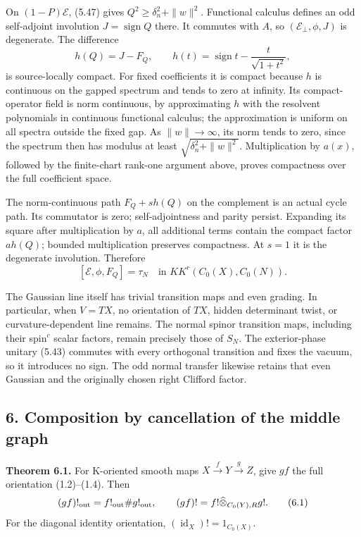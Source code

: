 \documentclass[
  11pt,
]{article}
\begin{document}
On \((1-P)\mathcal E\), (5.47) gives \(Q^2\geq\delta_n^2+\|w\|^2\).
Functional calculus defines an odd self-adjoint involution
\(J=\operatorname{sign}Q\) there. It commutes with \(A\), so
\((\mathcal E_{\perp},\phi,J)\) is degenerate. The difference \[
h(Q)=J-F_Q,
\qquad h(t)=\operatorname{sign}t-\frac{t}{\sqrt{1+t^2}},
\tag{5.52}
\] is source-locally compact. For fixed coefficients it is compact
because \(h\) is continuous on the gapped spectrum and tends to zero at
infinity. Its compact-operator field is norm continuous, by
approximating \(h\) with the resolvent polynomials in continuous
functional calculus; the approximation is uniform on all spectra outside
the fixed gap. As \(\|w\|\to\infty\), its norm tends to zero, since the
spectrum then has modulus at least \(\sqrt{\delta_n^2+\|w\|^2}\).
Multiplication by \(a(x)\), followed by the finite-chart rank-one
argument above, proves compactness over the full coefficient space.

The norm-continuous path \(F_Q+s h(Q)\) on the complement is an actual
cycle path. Its commutator is zero; self-adjointness and parity persist.
Expanding its square after multiplication by \(a\), all additional terms
contain the compact factor \(a h(Q)\); bounded multiplication preserves
compactness. At \(s=1\) it is the degenerate involution. Therefore \[
[\mathcal E,\phi,F_Q]=\tau_N\quad\text{in }KK^r(C_0(X),C_0(N)).
\tag{5.53}
\]

The Gaussian line itself has trivial transition maps and even grading.
In particular, when \(V=TX\), no orientation of \(TX\), hidden
determinant twist, or curvature-dependent line remains. The normal
spinor transition maps, including their spin\(^{c}\) scalar factors,
remain precisely those of \(S_N\). The exterior-phase unitary (5.43)
commutes with every orthogonal transition and fixes the vacuum, so it
introduces no sign. The odd normal transfer likewise retains that even
Gaussian and the originally chosen right Clifford factor.

\subsection{6. Composition by cancellation of the middle
graph}\label{composition-by-cancellation-of-the-middle-graph}

\textbf{Theorem 6.1.} For K-oriented smooth maps
\(X\xrightarrow{f}Y\xrightarrow{g}Z\), give \(gf\) the full orientation
(1.2)--(1.4). Then \[
 (gf)!_{\rm out}=f!_{\rm out}\#g!_{\rm out},\qquad
 (gf)!=f!\widehat\otimes_{C_0(Y),R}g!.
 \tag{6.1}
\] For the diagonal identity orientation,
\((\operatorname{id}_X)!=1_{C_0(X)}\).
\end{document}
